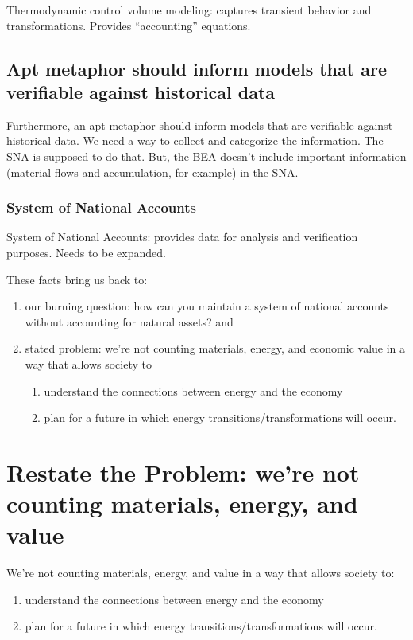 Thermodynamic control volume modeling: captures transient behavior 
and transformations.  
Provides ``accounting'' equations.

\subsection{Apt metaphor should inform models that are verifiable against historical data}
\label{sec:historically_verifiable}

Furthermore, an apt metaphor should inform models that are verifiable against historical data. We need a way to collect and categorize the information. The SNA is supposed to do that. But, the BEA doesn’t include important information (material flows and accumulation, for example) in the SNA. 

\subsubsection{System of National Accounts}
\label{sec:national_accounts}

System of National Accounts: provides data for analysis and verification purposes.  
Needs to be expanded.

These facts bring us back to:
\begin{enumerate}
	\item our burning question: how can you maintain a system of national accounts without accounting for natural assets? and
	\item stated problem: we're not counting materials, energy, and economic value in a way that allows society to
				\begin{enumerate}
					\item understand the connections between energy and the economy
					\item plan for a future in which energy transitions/transformations will occur.
				\end{enumerate}
\end{enumerate}


\section{Restate the Problem: we're not counting materials, energy, and value}
\label{sec:restate_problem}

We’re not counting materials, energy, and value in a way that allows society to: 
\begin{enumerate}
	\item understand the connections between energy and the economy
	\item plan for a future in which energy transitions/transformations will occur.
\end{enumerate} 




